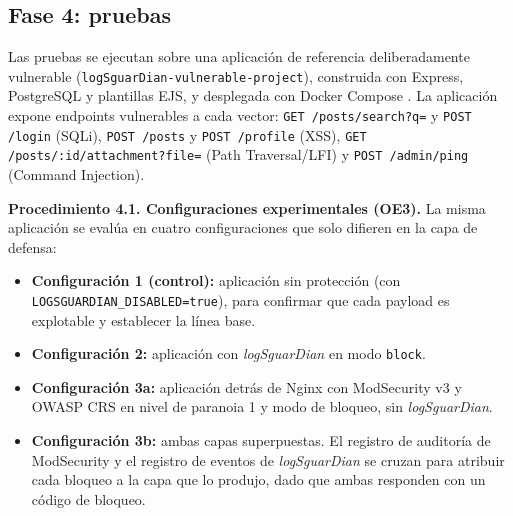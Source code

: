 \subsection{Fase 4: pruebas}
\label{subsec:met-f4}

Las pruebas se ejecutan sobre una aplicación de referencia deliberadamente vulnerable
(\texttt{logSguarDian-vulnerable-project}), construida con Express, PostgreSQL y plantillas EJS,
y desplegada con Docker Compose \cite{dockerdocs, moreau2023}. La aplicación expone endpoints
vulnerables a cada vector: \texttt{GET /posts/search?q=} y \texttt{POST /login} (SQLi),
\texttt{POST /posts} y \texttt{POST /profile} (XSS), \texttt{GET /posts/:id/attachment?file=}
(Path Traversal/LFI) y \texttt{POST /admin/ping} (Command Injection).

\textbf{Procedimiento 4.1. Configuraciones experimentales (OE3).} La misma aplicación se evalúa
en cuatro configuraciones que solo difieren en la capa de defensa:

\begin{itemize}
        \item \textbf{Configuración 1 (control):} aplicación sin protección (con
    \texttt{LOGSGUARDIAN\_DISABLED=true}), para confirmar que cada payload es explotable y
    establecer la línea base.
    \item \textbf{Configuración 2:} aplicación con \textit{logSguarDian} en modo \texttt{block}.
    \item \textbf{Configuración 3a:} aplicación detrás de Nginx con ModSecurity v3 \cite{owasp2026modsecurity} y OWASP CRS
    \cite{owaspcrs} en nivel de paranoia 1 y modo de bloqueo, sin \textit{logSguarDian}.
    \item \textbf{Configuración 3b:} ambas capas superpuestas. El registro de auditoría de
    ModSecurity y el registro de eventos de \textit{logSguarDian} se cruzan para atribuir cada
    bloqueo a la capa que lo produjo, dado que ambas responden con un código de bloqueo.
\end{itemize}

